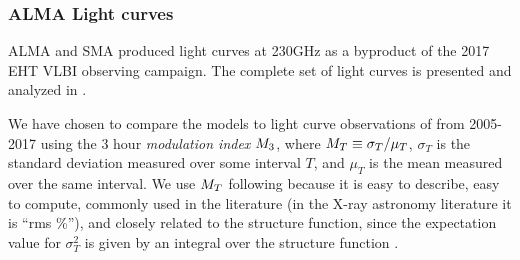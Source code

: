 
\subsubsection{ALMA Light curves}


ALMA and SMA produced \sgra light curves at 230GHz as a byproduct of the 2017 EHT VLBI observing campaign. The complete set of light curves is presented and analyzed in \cite{Wielgus2022}.

We have chosen to compare the models to light curve observations of \sgra from 2005-2017 using the 3 hour {\em modulation index} $M_{3}$, where $M_{T} \equiv \sigma_T/\mu_T$, $\sigma_T$ is the standard deviation measured over some interval $T$, and $\mu_T$ is the mean measured over the same interval.  We use $M_{T}$ following \citet{2015ApJ...812..103C} because it is easy to describe, easy to compute, commonly used in the literature (in the X-ray astronomy literature it is ``rms \%''), and closely related to the structure function, since the expectation value for $\sigma_T^2$ is given by an integral over the structure function \citep[see]{Lee_2022}.

